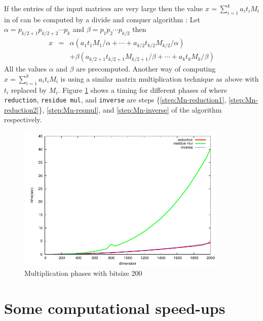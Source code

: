 If the entries of the input matrices are very large then the value $x = \sum_{i = 1}^k a_it_iM_i$ in 
 of   can be computed by a divide and conquer 
algorithm \cite{VonzurGathen1999}: Let $\alpha = p_{k / 2 + 1}p_{k / 2 + 2}\cdots p_k$ and $\beta = 
p_1p_2\cdots p_{k / 2}$ then
\begin{eqnarray*}
x & = & \alpha(a_1t_1M_1/\alpha + \cdots + a_{k / 2}t_{k / 2}M_{k / 2}/\alpha) \\
& & + \beta(a_{k / 2 + 1}t_{k / 2 + 1}M_{k / 2 + 1}/\beta + \cdots + a_kt_kM_k/\beta)
\end{eqnarray*}
All the values $\alpha$ and $\beta$ are precomputed. Another way of computing $x = \sum_{i = 1}^k 
a_it_iM_i$ is using a similar matrix multiplication technique as above with $t_i$ replaced by $M_i$. 
Figure \ref{figure:MMtimingDetail} shows a timing for different phases of 
 where \verb|reduction|, \verb|residue mul|, and \verb|inverse| are 
steps \{\ref{step:Mn-reduction1}, \ref{step:Mn-reduction2}\}, \ref{step:Mn-resmul}, and 
\ref{step:Mn-inverse} of the algorithm respectively.

\begin{figure}[ht]
\setlength{\abovecaptionskip}{-0.5cm}
\begin{center}
\includegraphics[width = 10cm]{figures/MMtimingDetail.pdf}
\end{center}
\caption{\small Multiplication phases with bitsize 200}
\label{figure:MMtimingDetail}
\end{figure}










\section{Some computational speed-ups}
\label{section:MMapll}

